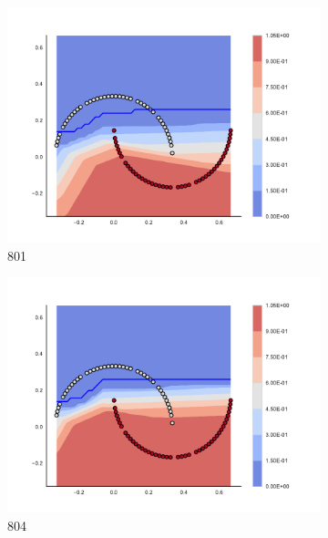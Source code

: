 \begin{figure}[h]
\begin{subfigure}[b]{0.09\textwidth}
    \includegraphics[clip, trim=2.35cm 1.75cm 4.5cm 0cm,width=\textwidth]{img/convergence/801.pdf}
    \caption{801}
    \label{fig:convergence_801}
\end{subfigure}
%
\begin{subfigure}[b]{0.09\textwidth}
    \includegraphics[clip, trim=2.35cm 1.75cm 4.5cm 0cm,width=\textwidth]{img/convergence/804.pdf}
    \caption{804}
    \label{fig:convergence_804}
\end{subfigure}
%
\begin{subfigure}[b]{0.09\textwidth}

\end{subfigure}
\end{figure}
